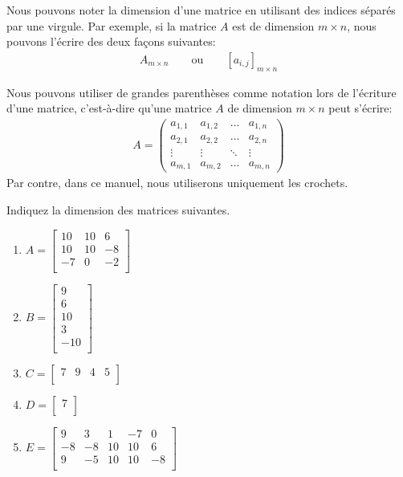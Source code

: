 \documentclass[]{book}
\providecommand{\tightlist}{%
  \setlength{\itemsep}{0pt}\setlength{\parskip}{0pt}}
\theoremstyle{definition}
\theoremstyle{definition}
\theoremstyle{definition}
\theoremstyle{remark}
\let\BeginKnitrBlock\begin \let\EndKnitrBlock\end
\begin{document}
\BeginKnitrBlock{remark}
{}Nous pouvons noter la dimension d'une matrice en utilisant des indices séparés par une virgule. Par exemple, si la matrice \(A\) est de dimension \(m \times n\), nous pouvons l'écrire des deux façons suivantes:
\begin{align*}
    A_{m\times n} \qquad \text{ou} \qquad [a_{i,j}]_{m\times n}
\end{align*}
\EndKnitrBlock{remark}

\BeginKnitrBlock{remark}
{}Nous pouvons utiliser de grandes parenthèses comme notation lors de l'écriture d'une matrice, c'est-à-dire qu'une matrice \(A\) de dimension \(m \times n\) peut s'écrire:
\begin{align*}
A = \begin{pmatrix}
a_{1,1}&a_{1,2}&\ldots &a_{1,n} \\
a_{2,1}&a_{2,2}&\ldots &a_{2,n}\\
\vdots &\vdots & \ddots &\vdots \\
a_{m,1}&a_{m,2}&\ldots &a_{m,n}
\end{pmatrix}
\end{align*}
Par contre, dans ce manuel, nous utiliserons uniquement les crochets.
\EndKnitrBlock{remark}

\BeginKnitrBlock{example}
\protect\hypertarget{exm:unnamed-chunk-45}{}{\label{exm:unnamed-chunk-45} }Indiquez la dimension des matrices suivantes.

\begin{enumerate}
\def\labelenumi{\alph{enumi}.}
\tightlist
\item
  \(A = \begin{bmatrix}  10&10&6\\  10&10&-8\\  -7&0&-2\\  \end{bmatrix}\)
\item
  \(B = \begin{bmatrix}  9\\  6\\  10\\  3\\  -10\\  \end{bmatrix}\)
\item
  \(C = \begin{bmatrix}  7&9&4&5\\  \end{bmatrix}\)
\item
  \(D = \begin{bmatrix}  7\\  \end{bmatrix}\)
\item
  \(E = \begin{bmatrix}  9&3&1&-7&0\\  -8&-8&10&10&6\\  9&-5&10&10&-8\\  \end{bmatrix}\)
\end{enumerate}
\EndKnitrBlock{example}
\end{document}
